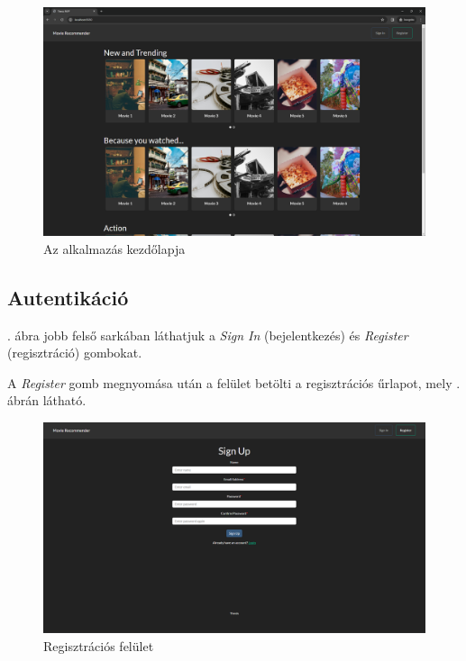 \documentclass[
]{thesis-ekf}
\theoremstyle{definition}
\theoremstyle{remark}
\begin{document}
\begin{figure}[H]
	\centering
	\includegraphics[width=14cm]{images/frontend-home-1.png}
	\caption[Az alkalmazás kezdőlapja]{Az alkalmazás kezdőlapja}
	\label{fig-home-page}
\end{figure}

\subsection{Autentikáció}
\label{demo-autentikacio}
. ábra jobb felső sarkában láthatjuk a \emph{Sign In} (bejelentkezés) és \emph{Register} (regisztráció) gombokat.

A \emph{Register} gomb megnyomása után a felület betölti a regisztrációs űrlapot, mely . ábrán látható.

\begin{figure}[H]
	\centering
	\includegraphics[width=14cm]{images/frontend-register-1.png}
	\caption[Regisztrációs felület]{Regisztrációs felület}
	\label{fig-register}
\end{figure}
\end{document}
